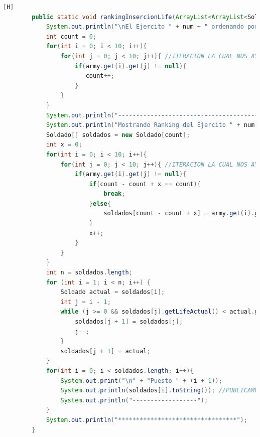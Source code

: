 \documentclass{article}
\begin{document}
	\begin{lstlisting}[language=java,caption={Las lineas de codigos del metodo creado:}][H]
		public static void rankingInsercionLife(ArrayList<ArrayList<Soldado>> army , int num){
			System.out.println("\nEl Ejercito " + num + " ordenando por metodo insercion: ");
			int count = 0;
			for(int i = 0; i < 10; i++){
				for(int j = 0; j < 10; j++){ //ITERACION LA CUAL NOS AYUDA A PASAR POR TODOS LOS SOLDADOS DE CADA EJERCITO
					if(army.get(i).get(j) != null){ 
					   count++;
					}
				}
			}
			System.out.println("------------------------------------------");
			System.out.println("Mostrando Ranking del Ejercito " + num + " ..... ////// --->");
			Soldado[] soldados = new Soldado[count];
			int x = 0;
			for(int i = 0; i < 10; i++){
				for(int j = 0; j < 10; j++){ //ITERACION LA CUAL NOS AYUDA A PASAR POR TODOS LOS SOLDADOS AL ARRAY SOLDADO PARA PODER USAR EL USO DEL METODO DE ORDENACION INSERCION
					if(army.get(i).get(j) != null){ 
						if(count - count + x == count){
							break;
						}else{
							soldados[count - count + x] = army.get(i).get(j); //LA MISMA LOGICA QUE EL ANTERIOR METODO SOLO QUE EN ESTE LO USARIAMOS DE MANERA DIFERENTE YA QUE ESTE SERIA DE FORMA DE INSERCION
						}
						x++;   
					}
				}
			}
			int n = soldados.length;
			for (int i = 1; i < n; i++) {
				Soldado actual = soldados[i];
				int j = i - 1;
				while (j >= 0 && soldados[j].getLifeActual() < actual.getLifeActual()) { //ORDENAMOS EL EJERCITO RESPECTIVAMENTE MEDIANTE EL METODO QUE NOS OFRECE INSERCION EL CUAL ES ESTE CODIGO
					soldados[j + 1] = soldados[j];
					j--;
				}
				soldados[j + 1] = actual;
			}
			for(int i = 0; i < soldados.length; i++){
				System.out.print("\n" + "Puesto " + (i + 1));
				System.out.println(soldados[i].toString()); //PUBLICAMOS RESULTADOS
				System.out.println("------------------");
			}
			System.out.println("*********************************");
		}

	\end{lstlisting}
\end{document}
